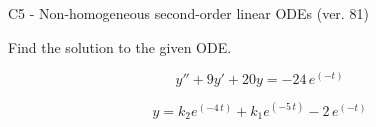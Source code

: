 \begin{exercise}
  \begin{exerciseTitle}C5 - Non-homogeneous second-order linear ODEs (ver. 81)\end{exerciseTitle}
  \begin{exerciseStatement}
    
Find the solution to the given ODE.

    
\[y''+9y'+20y = -24 \, e^{\left(-t\right)}\]

  \end{exerciseStatement}
  \begin{exerciseAnswer}
    
\[y= k_{2} e^{\left(-4 \, t\right)} + k_{1} e^{\left(-5 \, t\right)} - 2 \, e^{\left(-t\right)}\]

  \end{exerciseAnswer}
\end{exercise}